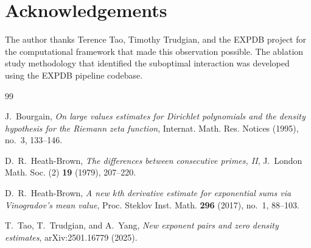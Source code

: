 \documentclass[11pt,a4paper]{amsart}
\theoremstyle{plain}
\theoremstyle{definition}
\begin{document}
\section*{Acknowledgements}
The author thanks Terence Tao, Timothy Trudgian, and the EXPDB project for the computational framework that made this observation possible. The ablation study methodology that identified the suboptimal interaction was developed using the EXPDB pipeline codebase.

\begin{thebibliography}{99}

J.~Bourgain,
\emph{On large values estimates for Dirichlet polynomials and the density hypothesis for the Riemann zeta function},
Internat. Math. Res. Notices (1995), no.~3, 133--146.

D.~R.~Heath-Brown,
\emph{The differences between consecutive primes, {II}},
J.~London Math. Soc. (2) \textbf{19} (1979), 207--220.

D.~R.~Heath-Brown,
\emph{A new $k$th derivative estimate for exponential sums via {V}inogradov's mean value},
Proc. Steklov Inst. Math. \textbf{296} (2017), no.~1, 88--103.

T.~Tao, T.~Trudgian, and A.~Yang,
\emph{New exponent pairs and zero density estimates},
arXiv:2501.16779 (2025).

\end{thebibliography}
\end{document}
